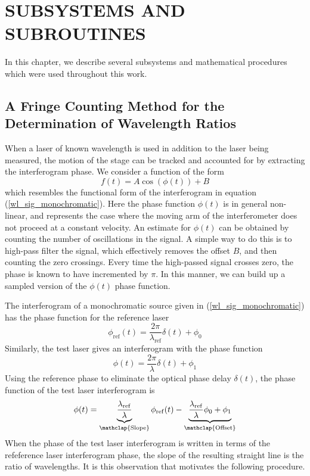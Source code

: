 
\chapter{SUBSYSTEMS AND SUBROUTINES}
In this chapter, we describe several subsystems and mathematical procedures which were used throughout this work.

\section{A Fringe Counting Method for the Determination of Wavelength Ratios} \label{sec:wl_ratios}
When a laser of known wavelength is used in addition to the laser being measured, the motion of the stage can be tracked and accounted for by extracting the interferogram phase. We consider a function of the form
\begin{equation}
	f(t) = A \cos(\phi(t)) + B
\end{equation}
which resembles the functional form of the interferogram in equation (\ref{wl_sig_monochromatic}). Here the phase function $\phi(t)$ is in general non-linear, and represents the case where the moving arm of the interferometer does not proceed at a constant velocity. An estimate for $\phi(t)$ can be obtained by counting the number of oscillations in the signal. A simple way to do this is to high-pass filter the signal, which effectively removes the offset $B$, and then counting the zero crossings. Every time the high-passed signal crosses zero, the phase is known to have incremented by $\pi$. In this manner, we can build up a sampled version of the $\phi(t)$ phase function.

The interferogram of a monochromatic source given in (\ref{wl_sig_monochromatic}) has the phase function for the reference laser
\begin{equation}
	\phi_\mathrm{ref}(t) = \frac{2\pi}{\lambda_\mathrm{ref}}\delta(t) + \phi_0
\end{equation}
Similarly, the test laser gives an interferogram with the phase function
\begin{equation}
	\phi(t) = \frac{2\pi}{\lambda}\delta(t) + \phi_1
\end{equation}
Using the reference phase to eliminate the optical phase delay $\delta(t)$, the phase function of the test laser interferogram is
\begin{equation} \label{wl_phase_slope}
	\phi(t) = \underbrace{\frac{\lambda_\mathrm{ref}}{\lambda}}_{\mathclap{\text{Slope}}}\phi_\mathrm{ref}(t) - \underbrace{\frac{\lambda_\mathrm{ref}}{\lambda}\phi_0 + \phi_1}_{\mathclap{\text{Offset}}}
\end{equation}
When the phase of the test laser interferogram is written in terms of the refeference laser interferogram phase, the slope of the resulting straight line is the ratio of wavelengths. It is this observation that motivates the following procedure.

